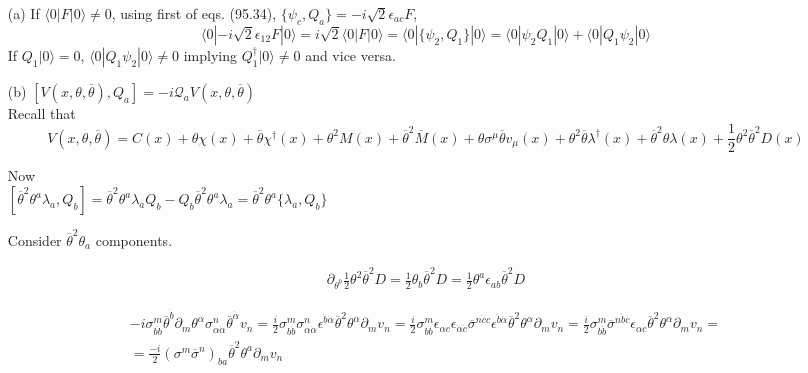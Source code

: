 \documentclass[twoside]{amsart}
\newcommand{\problemhead}[1]
  {\smallskip
   \noindent{\large\bf Problem #1.}
   }
\begin{document}
\problemhead{95.2}
\begin{enumerate}
\item[(a)] If $\langle 0 | F | 0 \rangle \neq 0$, using first of eqs. (95.34), $\lbrace \psi_c, Q_a \rbrace = -i \sqrt{2} \epsilon_{ac} F$, 
\[
\langle 0 | -i \sqrt{2} \epsilon_{12} F | 0 \rangle = i \sqrt{2} \langle 0 | F | 0 \rangle = \langle 0 | \lbrace \psi_2, Q_1 \rbrace | 0 \rangle = \langle 0 | \psi_2 Q_1 | 0 \rangle  + \langle 0 | Q_1 \psi_2 | 0 \rangle
\]
If $Q_1 | 0 \rangle =0$, $\langle 0 | Q_1 \psi_2 |  0 \rangle \neq 0$ implying $Q_1^{\dag} | 0 \rangle \neq 0$ and vice versa.  
\item[(b)] $[V(x,\theta,\overline{\theta}), Q_a] = -i \mathcal{Q}_aV(x,\theta, \overline{\theta})$   \\

Recall that 
\[
V(x,\theta, \overline{\theta} ) = C(x) + \theta \chi(x) + \overline{\theta} \chi^{\dag}(x) + \theta^2 M(x) + \overline{\theta}^2 \overline{M}(x) + \theta \sigma^{\mu} \overline{\theta} v_{\mu}(x) + \theta^2 \overline{\theta} \lambda^{\dag}(x) + \overline{\theta}^2 \theta \lambda(x) + \frac{1}{2} \theta^2 \overline{\theta}^2 D(x)
\]

Now \\
$[\overline{\theta}^2 \theta^a \lambda_a, Q_b ]= \overline{\theta}^2 \theta^a \lambda_a Q_b - Q_b \overline{\theta}^2 \theta^a \lambda_a = \overline{\theta}^2 \theta^a \lbrace \lambda_a, Q_b \rbrace$

Consider $\overline{\theta}^2 \theta_a$ components.  

\[
\begin{gathered}
  \partial_{\theta^b} \frac{1}{2} \theta^2 \overline{\theta}^2 D = \frac{1}{2} \theta_b \overline{\theta}^2 D = \frac{1}{2} \theta^a \epsilon_{ ab} \overline{\theta}^2 D
\end{gathered}
\]

\[
\begin{gathered}
  -i \sigma^m_{b\dot{b}} \overline{\theta}^{\dot{b}} \partial_m \theta^{\alpha} \sigma^n_{\alpha \dot{\alpha}} \overline{\theta}^{\dot{\alpha}} v_n = \frac{i}{2} \sigma^m_{b\dot{b}} \sigma^n_{\alpha \dot{\alpha} } \epsilon^{\dot{b} \dot{\alpha} } \overline{\theta}^2 \theta^{\alpha} \partial_m v_n = \frac{i}{2} \sigma^m_{b\dot{b}} \epsilon_{\alpha c} \epsilon_{\dot{ \alpha} \dot{c}} \overline{\sigma}^{n \dot{c } c } \epsilon^{\dot{b} \dot{\alpha}} \overline{\theta}^2 \theta^{\alpha} \partial_m v_n  = \frac{i}{2} \sigma^m_{b\dot{b}} \overline{\sigma}^{ n \dot{b} c} \epsilon_{\alpha c} \overline{\theta}^2 \theta^{\alpha} \partial_m v_n = \\
   = \frac{ -i }{2} (\sigma^m \overline{\sigma}^n )_{ba} \overline{\theta}^2 \theta^a \partial_m v_n
\end{gathered}
\]


\end{enumerate}
\end{document}
